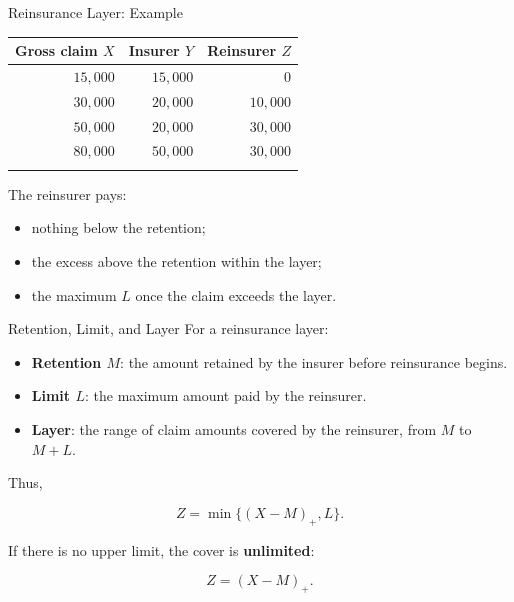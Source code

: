 \documentclass[
  ignorenonframetext,
  aspectratio=169,
]{beamer}
\newcounter{none} %
\providecommand{\tightlist}{%
  \setlength{\itemsep}{0pt}\setlength{\parskip}{0pt}}
\begin{document}
\begin{frame}{Reinsurance Layer: Example}
\protect{}\label{reinsurance-layer-example}
{\def\LTcaptype{none} %
\begin{longtable}[]{@{}rrr@{}}
\toprule\noalign{}
Gross claim \(X\) & Insurer \(Y\) & Reinsurer \(Z\) \\
\midrule\noalign{}
\endhead
\(15{,}000\) & \(15{,}000\) & \(0\) \\
\(30{,}000\) & \(20{,}000\) & \(10{,}000\) \\
\(50{,}000\) & \(20{,}000\) & \(30{,}000\) \\
\(80{,}000\) & \(50{,}000\) & \(30{,}000\) \\
\bottomrule\noalign{}
\end{longtable}
}

The reinsurer pays:

\begin{itemize}
\tightlist
\item
  nothing below the retention;
\item
  the excess above the retention within the layer;
\item
  the maximum \(L\) once the claim exceeds the layer.
\end{itemize}
\end{frame}

\begin{frame}{Retention, Limit, and Layer}
\protect{}\label{retention-limit-and-layer}
For a reinsurance layer:

\begin{itemize}
\tightlist
\item
  \textbf{Retention \(M\)}: the amount retained by the insurer before
  reinsurance begins.
\item
  \textbf{Limit \(L\)}: the maximum amount paid by the reinsurer.
\item
  \textbf{Layer}: the range of claim amounts covered by the reinsurer,
  from \(M\) to \(M+L\).
\end{itemize}

Thus,

\[
\boxed{
Z=\min\{(X-M)_+,L\}.
}
\]

If there is no upper limit, the cover is \textbf{unlimited}:

\[
Z=(X-M)_+.
\]
\end{frame}
\end{document}
